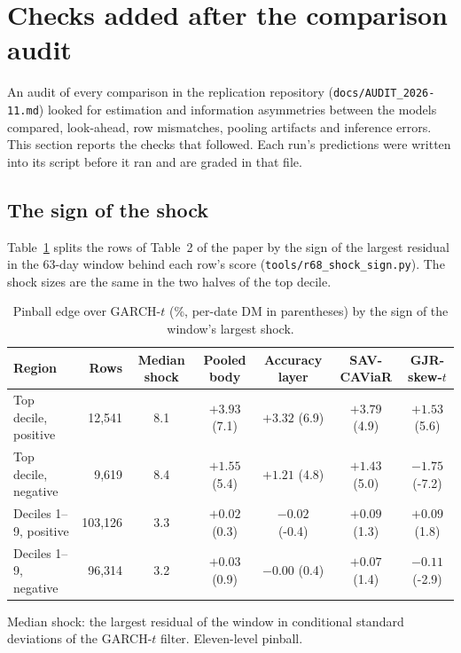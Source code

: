 \documentclass[11pt]{article}
\begin{document}
\section{Checks added after the comparison audit}\label{sec:r67}
An audit of every comparison in the replication repository (\texttt{docs/AUDIT\_2026-11.md}) looked for estimation and information asymmetries between the models compared, look-ahead, row mismatches, pooling artifacts and inference errors. This section reports the checks that followed. Each run's predictions were written into its script before it ran and are graded in that file.

\subsection*{The sign of the shock}
Table~\ref{tab:sign} splits the rows of Table~2 of the paper by the sign of the largest residual in the 63-day window behind each row's score (\texttt{tools/r68\_shock\_sign.py}). The shock sizes are the same in the two halves of the top decile.

\begin{table}[htbp]\centering\begin{threeparttable}
\caption{Pinball edge over GARCH-$t$ (\%, per-date DM in parentheses) by the sign of the window's largest shock.}\label{tab:sign}\footnotesize
\begin{tabular}{lrccccc}\toprule
Region & Rows & Median shock & Pooled body & Accuracy layer & SAV-CAViaR & GJR-skew-$t$ \\ \midrule
Top decile, positive & 12,541 & 8.1 & $+3.93$ (7.1) & $+3.32$ (6.9) & $+3.79$ (4.9) & $+1.53$ (5.6) \\
Top decile, negative & 9,619 & 8.4 & $+1.55$ (5.4) & $+1.21$ (4.8) & $+1.43$ (5.0) & $-1.75$ (-7.2) \\
Deciles 1--9, positive & 103,126 & 3.3 & $+0.02$ (0.3) & $-0.02$ (-0.4) & $+0.09$ (1.3) & $+0.09$ (1.8) \\
Deciles 1--9, negative & 96,314 & 3.2 & $+0.03$ (0.9) & $-0.00$ (0.4) & $+0.07$ (1.4) & $-0.11$ (-2.9) \\
\bottomrule\end{tabular}
\begin{tablenotes}\footnotesize\item Median shock: the largest residual of the window in conditional standard deviations of the GARCH-$t$ filter. Eleven-level pinball.\end{tablenotes}
\end{threeparttable}\end{table}
\end{document}
